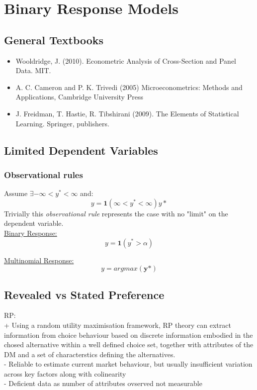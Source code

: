 \documentclass[DIV=14,titlepage=false]{scrreprt}
\begin{document}
\vspace{-10pt}
\setcounter{chapter}{0}
\chapter{Binary Response Models}
\section{General Textbooks}
\begin{itemize}
    \item Wooldridge, J. (2010). Econometric Analysis of Cross-Section and Panel Data. MIT.
    \item A. C. Cameron and P. K. Trivedi (2005) Microeconometrics: Methods and Applications, Cambridge University Press
    \item J. Freidman, T. Hastie, R. Tibshirani (2009). The Elements of Statistical Learning. Springer, publishers.
\end{itemize}

\section{Limited Dependent Variables}
\subsection{Observational rules}
Assume \(\exists - \infty < y^* < \infty\) and:
\[y=\textbf{1} (\infty < y^* < \infty)y*\]
Trivially this \textit{observational rule} represents the case with no "limit" on the dependent variable.\\

\underline{Binary Response:}
\[y=\textbf{1} (y^* > \alpha)\]

\underline{Multinomial Response:}
\[y=argmax(\textbf{y*})\]

\section{Revealed vs Stated Preference}

RP:\\
+ Using a random utility maximisation framework, RP theory can extract information from choice behaviour based on discrete information embodied in the chosed alternative within a well defined choice set, together with attributes of the DM and a set of characterstics defining the alternatives.\\
- Reliable to estimate current market behaviour, but usually insufficient variation across key factors along with colinearity\\
- Deficient data as number of attributes ovserved not measurable\\
\end{document}
